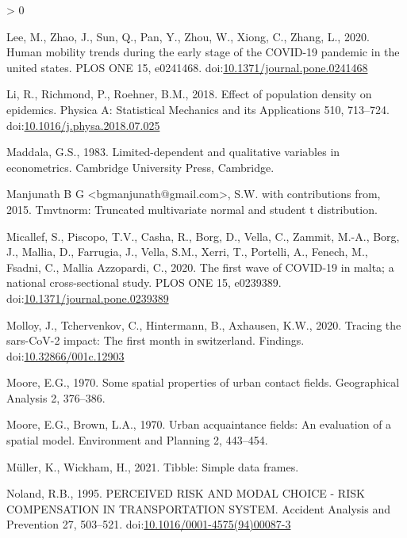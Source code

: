 \documentclass[]{elsarticle} %
\newlength{\cslhangindent}
\newenvironment{CSLReferences}[2] %
 {%
  \setlength{\parindent}{0pt}
  \ifodd #1 \everypar{\setlength{\hangindent}{\cslhangindent}}\ignorespaces\fi
  \ifnum #2 > 0
  \setlength{\parskip}{#2\baselineskip}
  \fi
 }%
 {}
\begin{document}
\begin{CSLReferences}{1}{0}
\leavevmode\hypertarget{ref-Lee2020human}{}%
Lee, M., Zhao, J., Sun, Q., Pan, Y., Zhou, W., Xiong, C., Zhang, L.,
2020. Human mobility trends during the early stage of the COVID-19
pandemic in the united states. PLOS ONE 15, e0241468.
doi:\href{https://doi.org/10.1371/journal.pone.0241468}{10.1371/journal.pone.0241468}

\leavevmode\hypertarget{ref-Li2018effect}{}%
Li, R., Richmond, P., Roehner, B.M., 2018. Effect of population density
on epidemics. Physica A: Statistical Mechanics and its Applications 510,
713--724.
doi:\href{https://doi.org/10.1016/j.physa.2018.07.025}{10.1016/j.physa.2018.07.025}

\leavevmode\hypertarget{ref-Maddala1983limited}{}%
Maddala, G.S., 1983. Limited-dependent and qualitative variables in
econometrics. Cambridge University Press, Cambridge.

\leavevmode\hypertarget{ref-R-tmvtnorm}{}%
Manjunath B G \textless bgmanjunath@gmail.com\textgreater, S.W. with
contributions from, 2015. Tmvtnorm: Truncated multivariate normal and
student t distribution.

\leavevmode\hypertarget{ref-Micallef2020first}{}%
Micallef, S., Piscopo, T.V., Casha, R., Borg, D., Vella, C., Zammit,
M.-A., Borg, J., Mallia, D., Farrugia, J., Vella, S.M., Xerri, T.,
Portelli, A., Fenech, M., Fsadni, C., Mallia Azzopardi, C., 2020. The
first wave of COVID-19 in malta; a national cross-sectional study. PLOS
ONE 15, e0239389.
doi:\href{https://doi.org/10.1371/journal.pone.0239389}{10.1371/journal.pone.0239389}

\leavevmode\hypertarget{ref-Molloy2020Tracing}{}%
Molloy, J., Tchervenkov, C., Hintermann, B., Axhausen, K.W., 2020.
Tracing the sars-CoV-2 impact: The first month in switzerland. Findings.
doi:\href{https://doi.org/10.32866/001c.12903}{10.32866/001c.12903}

\leavevmode\hypertarget{ref-Moore1970some}{}%
Moore, E.G., 1970. Some spatial properties of urban contact fields.
Geographical Analysis 2, 376--386.

\leavevmode\hypertarget{ref-Moore1970urban}{}%
Moore, E.G., Brown, L.A., 1970. Urban acquaintance fields: An evaluation
of a spatial model. Environment and Planning 2, 443--454.

\leavevmode\hypertarget{ref-R-tibble}{}%
Müller, K., Wickham, H., 2021. Tibble: Simple data frames.

\leavevmode\hypertarget{ref-Noland1995perceived}{}%
Noland, R.B., 1995. PERCEIVED RISK AND MODAL CHOICE - RISK COMPENSATION
IN TRANSPORTATION SYSTEM. Accident Analysis and Prevention 27, 503--521.
doi:\href{https://doi.org/10.1016/0001-4575(94)00087-3}{10.1016/0001-4575(94)00087-3}


\end{CSLReferences}
\end{document}
